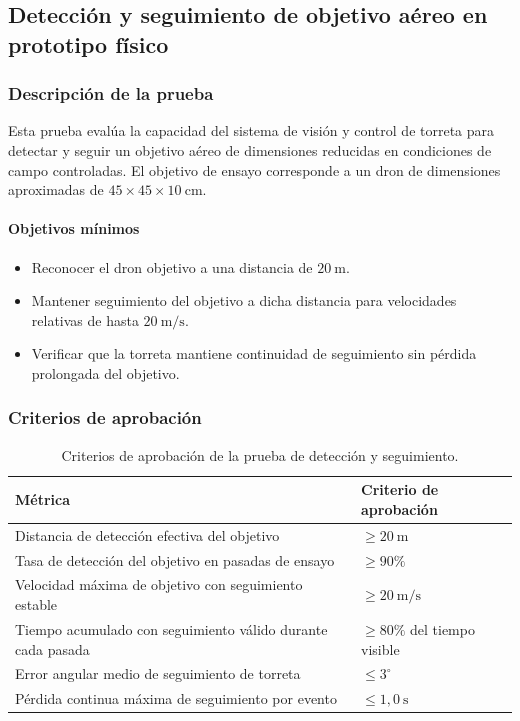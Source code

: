 \subsection{Detección y seguimiento de objetivo aéreo en prototipo físico}

\subsubsection{Descripción de la prueba}

Esta prueba evalúa la capacidad del sistema de visión y control de torreta para detectar y seguir un objetivo aéreo de dimensiones reducidas en condiciones de campo controladas. El objetivo de ensayo corresponde a un dron de dimensiones aproximadas de $45 \times 45 \times 10\ \text{cm}$.

\paragraph{Objetivos mínimos}
\begin{itemize}
    \item Reconocer el dron objetivo a una distancia de $20\ \text{m}$.
    \item Mantener seguimiento del objetivo a dicha distancia para velocidades relativas de hasta $20\ \text{m/s}$.
    \item Verificar que la torreta mantiene continuidad de seguimiento sin pérdida prolongada del objetivo.
\end{itemize}

\subsubsection{Criterios de aprobación}

\begin{table}[H]
\centering
\small
\begin{tabular}{p{8.8cm} p{4.1cm}}
\toprule
\textbf{Métrica} & \textbf{Criterio de aprobación} \\
\midrule
Distancia de detección efectiva del objetivo & $\geq 20\ \text{m}$ \\
Tasa de detección del objetivo en pasadas de ensayo & $\geq 90\%$ \\
Velocidad máxima de objetivo con seguimiento estable & $\geq 20\ \text{m/s}$ \\
Tiempo acumulado con seguimiento válido durante cada pasada & $\geq 80\%$ del tiempo visible \\
Error angular medio de seguimiento de torreta & $\leq 3^\circ$ \\
Pérdida continua máxima de seguimiento por evento & $\leq 1{,}0\ \text{s}$ \\
\bottomrule
\end{tabular}
\caption{Criterios de aprobación de la prueba de detección y seguimiento.}
\label{tab:criterios_prueba_trackeo}
\end{table}

